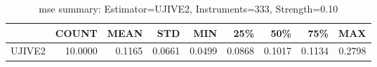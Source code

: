 \begin{table}[ht]
\centering
\caption{mse summary: Estimator=UJIVE2, Instruments=333, Strength=0.10}
\begin{tabular}{lrrrrrrrr}
\toprule
 & COUNT & MEAN & STD & MIN & 25\% & 50\% & 75\% & MAX \\
\midrule
UJIVE2 & 10.0000 & 0.1165 & 0.0661 & 0.0499 & 0.0868 & 0.1017 & 0.1134 & 0.2798 \\
\bottomrule
\end{tabular}
\end{table}
